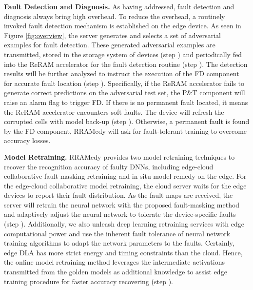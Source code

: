 \textbf{Fault Detection and Diagnosis.} As having addressed, fault detection and diagnosis always bring high overhead. To reduce the overhead, a routinely invoked fault detection mechanism is established on the edge device. As seen in Figure \ref{fig:overview}, the server generates and selects a set of adversarial examples for fault detection. These generated adversarial examples are transmitted, stored in the storage system of devices (step ) and periodically fed into the ReRAM accelerator for the fault detection routine (step ). The detection results will be further analyzed to instruct the execution of the FD component for accurate fault location (step ). Specifically, if the ReRAM accelerator fails to generate correct predictions on the adversarial test set, the P\&T component will raise an alarm flag to trigger FD. If there is no permanent fault located, it means the ReRAM accelerator encounters soft faults. The device will refresh the corrupted cells with model back-up (step ). Otherwise, a permanent fault is found by the FD component, RRAMedy will ask for fault-tolerant training to overcome accuracy losses.
                                                                                                                
\textbf{Model Retraining.} RRAMedy provides two model retraining techniques to recover the recognition accuracy of faulty DNNs, including edge-cloud collaborative fault-masking retraining and in-situ model remedy on the edge. For the edge-cloud collaborative model retraining, the cloud server waits for the edge devices to report their fault distribution. As the fault maps are received, the server will retrain the neural network with the proposed fault-masking method and adaptively adjust the neural network to tolerate the device-specific faults (step ). Additionally, we also unleash deep learning retraining services with edge computational power and use the inherent fault tolerance of neural network training algorithms to adapt the network parameters to the faults. Certainly, edge DLA has more strict energy and timing constraints than the cloud. Hence, the online model retraining method leverages the intermediate activations transmitted from the golden models as additional knowledge to assist edge training procedure for faster accuracy recovering (step ).
                                                                                                                            
